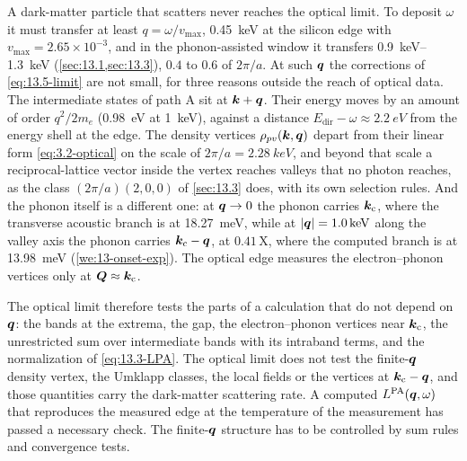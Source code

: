 A dark-matter particle that scatters never reaches the optical limit. To deposit $\omega$ it must transfer at least $q = \omega/v_{\mathrm{max}}$, \SI{0.45}{keV} at the silicon edge with $v_{\mathrm{max}} = 2.65\times10^{-3}$, and in the phonon-assisted window it transfers \SIrange{0.9}{1.3}{keV} (\cref{sec:13.1,sec:13.3}), $0.4$ to $0.6$ of $2\pi/a$. At such $\bm{q}$ the corrections of \cref{eq:13.5-limit} are not small, for three reasons outside the reach of optical data. The intermediate states of path A sit at $\bm{k}+\bm{q}$. Their energy moves by an amount of order $q^2/2m_e$ (\SI{0.98}{eV} at \SI{1}{keV}), against a distance $E_{\mathrm{dir}} - \omega \approx \SI{2.2}{eV}$ from the energy shell at the edge. The density vertices $\rho_{pv}(\bm{k},\bm{q})$ depart from their linear form \cref{eq:3.2-optical} on the scale of $2\pi/a = \SI{2.28}{keV}$, and beyond that scale a reciprocal-lattice vector inside the vertex reaches valleys that no photon reaches, as the class $(2\pi/a)(2,0,0)$ of \cref{sec:13.3} does, with its own selection rules. And the phonon itself is a different one: at $\bm{q} \to 0$ the phonon carries $\bm{k}_{\mathrm{c}}$, where the transverse acoustic branch is at \SI{18.27}{meV}, while at $|\bm{q}| = \SI{1.0}{keV}$ along the valley axis the phonon carries $\bm{k}_{\mathrm{c}} - \bm{q}$, at $0.41\,\mathrm{X}$, where the computed branch is at \SI{13.98}{meV} (\cref{we:13-onset-exp}). The optical edge measures the electron--phonon vertices only at $\bm{Q} \approx \bm{k}_{\mathrm{c}}$.

The optical limit therefore tests the parts of a calculation that do not depend on $\bm{q}$: the bands at the extrema, the gap, the electron--phonon vertices near $\bm{k}_{\mathrm{c}}$, the unrestricted sum over intermediate bands with its intraband terms, and the normalization of \cref{eq:13.3-LPA}. The optical limit does not test the finite-$\bm{q}$ density vertex, the Umklapp classes, the local fields or the vertices at $\bm{k}_{\mathrm{c}} - \bm{q}$, and those quantities carry the dark-matter scattering rate. A computed $L^{\mathrm{PA}}(\bm{q},\omega)$ that reproduces the measured edge at the temperature of the measurement has passed a necessary check. The finite-$\bm{q}$ structure has to be controlled by sum rules and convergence tests.
